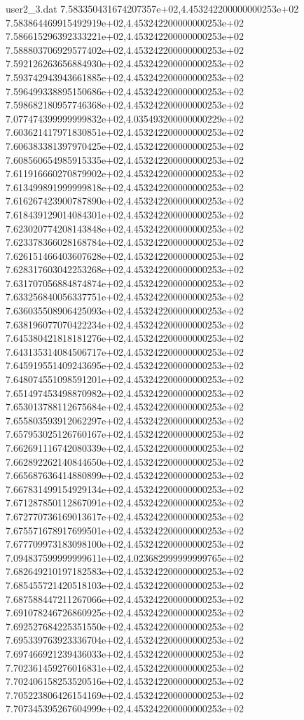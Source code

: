 \begin{filecontents}{user2_3.dat}
7.583350431674207357e+02,4.453242200000000253e+02
7.583864469915492919e+02,4.453242200000000253e+02
7.586615296392333221e+02,4.453242200000000253e+02
7.588803706929577402e+02,4.453242200000000253e+02
7.592126263656884930e+02,4.453242200000000253e+02
7.593742943943661885e+02,4.453242200000000253e+02
7.596499338895150686e+02,4.453242200000000253e+02
7.598682180957746368e+02,4.453242200000000253e+02
7.077474399999999832e+02,4.035493200000000229e+02
7.603621417971830851e+02,4.453242200000000253e+02
7.606383381397970425e+02,4.453242200000000253e+02
7.608560654985915335e+02,4.453242200000000253e+02
7.611916660270879902e+02,4.453242200000000253e+02
7.613499891999999818e+02,4.453242200000000253e+02
7.616267423900787890e+02,4.453242200000000253e+02
7.618439129014084301e+02,4.453242200000000253e+02
7.623020774208143848e+02,4.453242200000000253e+02
7.623378366028168784e+02,4.453242200000000253e+02
7.626151466403607628e+02,4.453242200000000253e+02
7.628317603042253268e+02,4.453242200000000253e+02
7.631707056884874874e+02,4.453242200000000253e+02
7.633256840056337751e+02,4.453242200000000253e+02
7.636035508906425093e+02,4.453242200000000253e+02
7.638196077070422234e+02,4.453242200000000253e+02
7.645380421818181276e+02,4.453242200000000253e+02
7.643135314084506717e+02,4.453242200000000253e+02
7.645919551409243695e+02,4.453242200000000253e+02
7.648074551098591201e+02,4.453242200000000253e+02
7.651497453498870982e+02,4.453242200000000253e+02
7.653013788112675684e+02,4.453242200000000253e+02
7.655803593912062297e+02,4.453242200000000253e+02
7.657953025126760167e+02,4.453242200000000253e+02
7.662691116742080339e+02,4.453242200000000253e+02
7.662892262140844650e+02,4.453242200000000253e+02
7.665687636414880899e+02,4.453242200000000253e+02
7.667831499154929134e+02,4.453242200000000253e+02
7.671287850112867091e+02,4.453242200000000253e+02
7.672770736169013617e+02,4.453242200000000253e+02
7.675571678917699501e+02,4.453242200000000253e+02
7.677709973183098100e+02,4.453242200000000253e+02
7.094837599999999611e+02,4.023682999999999765e+02
7.682649210197182583e+02,4.453242200000000253e+02
7.685455721420518103e+02,4.453242200000000253e+02
7.687588447211267066e+02,4.453242200000000253e+02
7.691078246726860925e+02,4.453242200000000253e+02
7.692527684225351550e+02,4.453242200000000253e+02
7.695339763923336704e+02,4.453242200000000253e+02
7.697466921239436033e+02,4.453242200000000253e+02
7.702361459276016831e+02,4.453242200000000253e+02
7.702406158253520516e+02,4.453242200000000253e+02
7.705223806426154169e+02,4.453242200000000253e+02
7.707345395267604999e+02,4.453242200000000253e+02

\end{filecontents}
